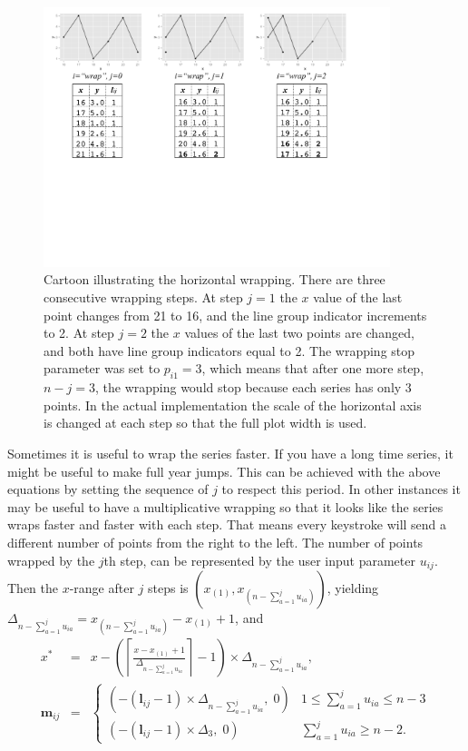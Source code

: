 \documentclass[12pt]{article}
\begin{document}
\begin{itemize}
\begin{center}
\begin{figure}[htp]
\centerline{\includegraphics[width=0.9\textwidth]{graph/wrap-example.pdf}}
\caption{\label{fig:x-wrapping-algorithm} Cartoon illustrating
the horizontal wrapping. There are three consecutive wrapping
steps. At step $j=1$ the $x$ value of the last point changes
from 21 to 16, and the line group indicator increments to 2.
At step $j=2$ the $x$ values of the last two points are changed,
and both have line group indicators equal to 2.  The wrapping
stop parameter was set to $p_{i1}=3$, which means that after
one more step, $n-j=3$, the wrapping would stop because each
series has only 3 points. In the actual implementation the
scale of the horizontal axis is changed at each step so that
the full plot width is used.}
\end{figure}
\end{center}

Sometimes it is useful to wrap the series faster. If you have
a long time series, it might be useful to make full year jumps.
This can be achieved with the above equations by setting the
sequence of $j$ to respect this period. In other instances it
may be useful to have a multiplicative wrapping so that it
looks like the series wraps faster and faster with each step.
That means every keystroke will send a different number of
points from the right to the left. The number of points
wrapped by the $j$th step, can be represented by the user
input parameter $u_{ij}$. Then the $x$-range after $j$ steps
is $(x_{(1)}, x_{(n-\sum_{a=1}^j u_{ia})})$, yielding
$\Delta_{n-\sum_{a=1}^j u_{ia}}=x_{(n-\sum_{a=1}^j u_{ia})}-x_{(1)}+1$, and
\begin{eqnarray*}
x^* & = & x-\left(\left\lceil \frac{x-x_{(1)}+1}{\Delta_{n-\sum_{a=1}^j u_{ia}}}\right\rceil -1\right)\times\Delta_{n-\sum_{a=1}^j u_{ia}}, \\
\mathbf{m}{}_{ij} & = & \begin{cases}
(-(\mathbf{l}{}_{ij} -1)\times\Delta_{n-\sum_{a=1}^j u_{ia}}, \; 0) & 1\leq \sum_{a=1}^j u_{ia} \leq n-3 \\
(-(\mathbf{l}{}_{ij} -1)\times\Delta_3, \; 0) & \sum_{a=1}^j u_{ia}\ge n-2.
\end{cases}
\end{eqnarray*}


\end{itemize}
\end{document}
